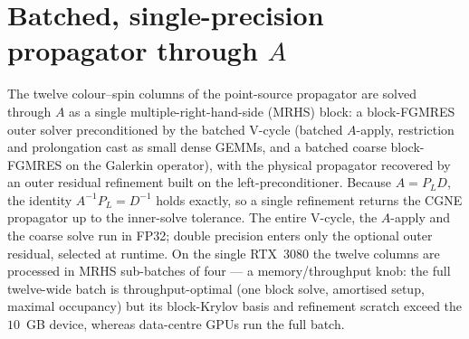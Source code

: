 \documentclass[12pt,a4paper]{article}
\newcommand{\Ddw}{D}
\newcommand{\Aop}{A}
\newcommand{\PL}{P_{L}}
\begin{document}
\section{Batched, single-precision propagator through \texorpdfstring{$\Aop$}{A}}
\label{sec:batched}

The twelve colour--spin columns of the point-source propagator are solved through
$\Aop$ as a single multiple-right-hand-side (MRHS) block: a block-FGMRES outer
solver preconditioned by the batched V-cycle (batched $\Aop$-apply, restriction
and prolongation cast as small dense GEMMs, and a batched coarse block-FGMRES on
the Galerkin operator), with the physical propagator recovered by an outer
residual refinement built on the left-preconditioner. Because $\Aop=\PL\Ddw$, the
identity $\Aop^{-1}\PL=\Ddw^{-1}$ holds exactly, so a single refinement returns
the CGNE propagator up to the inner-solve tolerance. The entire V-cycle, the
$\Aop$-apply and the coarse solve run in FP32; double precision enters only the
optional outer residual, selected at runtime. On the single RTX~3080 the twelve
columns are processed in MRHS sub-batches of four --- a memory/throughput knob:
the full twelve-wide batch is throughput-optimal (one block solve, amortised
setup, maximal occupancy) but its block-Krylov basis and refinement scratch
exceed the $10$~GB device, whereas data-centre GPUs run the full batch.
\end{document}
